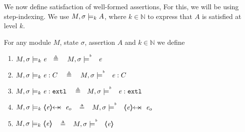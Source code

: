  We now define satisfaction of well-formed assertions, For this, we will be using step-indexing. 
 We use $M , \sigma \models_{k} {A}$, where $k\in \mathbb{N}$ to express that $A$ is satisfied at level $k$.
 
 
 \begin{definition} 
For any module $M$, state $\sigma$, assertion $A$ and $k\!\in\! \mathbb{N}$ we define
\begin{enumerate}
\item
\label{cExpr}
$\satisfiesAK{M}{\sigma} k {\re}  \ \ \triangleq \ \ \   \satisfiesAB{M}{\sigma}{{\re}}$
\item
\label{cClass}
$\satisfiesAK{M}{\sigma} k {\re  : C}\ \ \ \triangleq \ \ \    \satisfiesAB{M}{\sigma} {\re  : C}$
\item
\label{cExternal}
$\satisfiesAK{M}{\sigma} k {\external{{\re}}} \ \ \ \triangleq \ \ \satisfiesAB{M}{\sigma}{\external{{\re}}} $
 
 \item
 \label{cProtected}
$\satisfiesAK{M}{\sigma} k {\protectedFrom{{\re}} {{\re_{o}}}}$ $\ \  \triangleq\ \ $
$\satisfiesAB{M}{\sigma}{\protectedFrom{{\re}} {{\re_{o}}}}$ 

\item
 \label{sect:semantics:assert:prt}
$M , \sigma \models_{k} {\langle\!\!\langle {\mathit{e}} \rangle\!\!\rangle} $ $\ \  \triangleq\ \  $ 
$M , \sigma \models^{^b}\ \ {\langle\!\!\langle {\mathit{e}} \rangle\!\!\rangle}$ 
 

\end{enumerate}
\end{definition}

